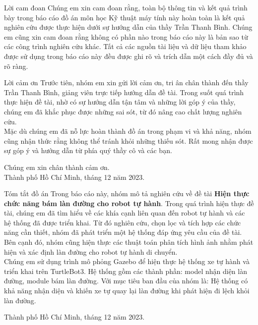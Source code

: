 \begin{preface}{Lời cam đoan}
\tab Chúng em xin cam đoan rằng, toàn bộ thông tin và kết quả trình bày trong báo cáo đồ án môn học Kỹ thuật máy tính này hoàn toàn là kết quả nghiên cứu được thực hiện dưới sự hướng dẫn của thầy Trần Thanh Bình. Chúng em cũng xin cam đoan rằng không có phần nào trong báo cáo này là bản sao từ các công trình nghiên cứu khác. Tất cả các nguồn tài liệu và dữ liệu tham khảo được sử dụng trong báo cáo này đều được ghi rõ và trích dẫn một cách đầy đủ và rõ ràng.
\end{preface}
\newpage
\begin{preface}{Lời cảm ơn}
\tab Trước tiên, nhóm em xin gửi lời cảm ơn, tri ân chân thành đến thầy Trần Thanh Bình, giảng viên trực tiếp hướng dẫn đề tài. Trong suốt quá trình thực hiện đề tài, nhờ có sự hướng dẫn tận tâm và những lời góp ý của thầy, chúng em đã khắc phục được những sai sót, từ đó nâng cao chất lượng nghiên cứu.\\
\tab Mặc dù chúng em đã nỗ lực hoàn thành đồ án trong phạm vi và khả năng, nhóm cũng nhận thức rằng không thể tránh khỏi những thiếu sót. Rất mong nhận được sự góp ý và hướng dẫn từ phía quý thầy cô và các bạn.
\begin{flushright}
Chúng em xin chân thành cảm ơn.\\
Thành phố Hồ Chí Minh, tháng 12 năm 2023.
\end{flushright}
\end{preface}
\newpage
\begin{preface}{Tóm tắt đồ án}
\tab Trong báo cáo này, nhóm mô tả nghiên cứu về đề tài \textbf{Hiện thực chức năng bám làn đường cho robot tự hành}. Trong quá trình hiện thực đề tài, chúng em đã tìm hiểu về các khía cạnh liên quan đến robot tự hành và các hệ thống đã được triển khai. Từ đó nghiên cứu, chọn lọc và tích hợp các chức năng cần thiết, nhóm đã phát triển một hệ thống đáp ứng yêu cầu của đề tài. Bên cạnh đó, nhóm cũng hiện thực các thuật toán phân tích hình ảnh nhằm phát hiện và xác định làn đường cho robot tự hành di chuyển.\\
\tab Chúng em sử dụng trình mô phỏng Gazebo để hiện thực hệ thống xe tự hành và triển khai trên TurtleBot3. Hệ thống gồm các thành phần: model nhận diện làn đường, module bám làn đường. Với mục tiêu ban đầu của nhóm là: Hệ thống có khả năng nhận diện và khiến xe tự quay lại làn đường khi phát hiện đi lệch khỏi làn đường.
\begin{flushright}
Thành phố Hồ Chí Minh, tháng 12 năm 2023.
\end{flushright}
\end{preface}
